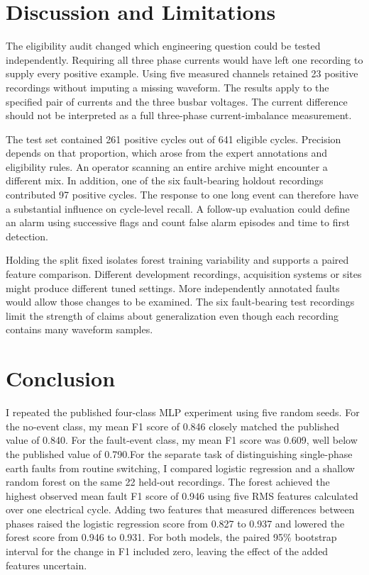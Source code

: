 \documentclass[11pt,conference,letterpaper]{IEEEtran}
\begin{document}
\section{Discussion and Limitations}
The eligibility audit changed which engineering question could be tested independently. Requiring all three phase currents would have left one recording to supply every positive example. Using five measured channels retained 23 positive recordings without imputing a missing waveform. The results apply to the specified pair of currents and the three busbar voltages. The current difference should not be interpreted as a full three-phase current-imbalance measurement.

The test set contained 261 positive cycles out of 641 eligible cycles. Precision depends on that proportion, which arose from the expert annotations and eligibility rules. An operator scanning an entire archive might encounter a different mix. In addition, one of the six fault-bearing holdout recordings contributed 97 positive cycles. The response to one long event can therefore have a substantial influence on cycle-level recall. A follow-up evaluation could define an alarm using successive flags and count false alarm episodes and time to first detection.

Holding the split fixed isolates forest training variability and supports a paired feature comparison. Different development recordings, acquisition systems or sites might produce different tuned settings. More independently annotated faults would allow those changes to be examined. The six fault-bearing test recordings limit the strength of claims about generalization even though each recording contains many waveform samples.

\section{Conclusion}
I repeated the published four-class MLP experiment using five random seeds. For the no-event class, my mean F1 score of 0.846 closely matched the published value of 0.840. For the fault-event class, my mean F1 score was 0.609, well below the published value of 0.790.For the separate task of distinguishing single-phase earth faults from routine switching, I compared logistic regression and a shallow random forest on the same 22 held-out recordings. The forest achieved the highest observed mean fault F1 score of 0.946 using five RMS features calculated over one electrical cycle. Adding two features that measured differences between phases raised the logistic regression score from 0.827 to 0.937 and lowered the forest score from 0.946 to 0.931. For both models, the paired 95\% bootstrap interval for the change in F1 included zero, leaving the effect of the added features uncertain.
\end{document}

